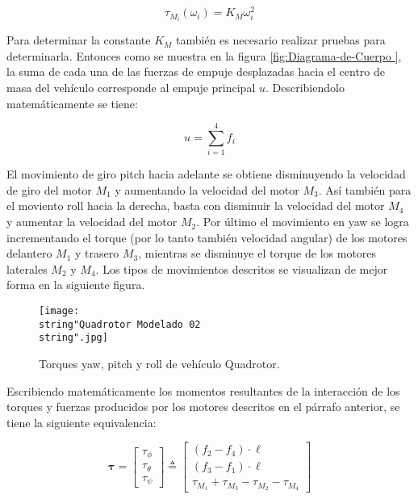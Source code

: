 \documentclass[../main.tex]{subfiles}
\begin{document}
\begin{equation}
\tau_{M_{i}}(\omega_{i})=K_{M}\omega_{i}^{2}
\end{equation}

Para determinar la constante $K_{M}$ también es necesario realizar
pruebas para determinarla.
Entonces como se muestra en la figura \ref{fig:Diagrama-de-Cuerpo },
la suma de cada una de las fuerzas de empuje desplazadas hacia el
centro de masa del vehículo corresponde al empuje principal $u.$
Describiendolo matemáticamente se tiene:

\begin{equation}
u=\sum_{i=1}^{4}f_{i}\label{eq:Empuje Total}
\end{equation}

El movimiento de giro pitch hacia adelante se obtiene disminuyendo
la velocidad de giro del motor $M_{1}$ y aumentando la velocidad
del motor $M_{3}$. Así también para el moviento roll hacia la derecha,
basta con disminuir la velocidad del motor $M_{4}$ y aumentar la
velocidad del motor $M_{2}$. Por último el movimiento en yaw se logra
incrementando el torque (por lo tanto también velocidad angular) de
los motores delantero $M_{1}$ y trasero $M_{3}$, mientras se disminuye
el torque de los motores laterales $M_{2}$ y $M_{4}$. Los tipos
de movimientos descritos se visualizan de mejor forma en la siguiente
figura.

\begin{figure}[H]
\noindent \begin{centering}
\texttt{[image: \\string"Quadrotor Modelado 02\\string".jpg]}
\par\end{centering}
\caption{Torques yaw, pitch y roll de vehículo Quadrotor.}
\end{figure}

\textcompwordmark{}

Escribiendo matemáticamente los momentos resultantes de la interacción
de los torques y fuerzas producidos por los motores descritos en el
párrafo anterior, se tiene la siguiente equivalencia:

\begin{equation}
\mathbf{\tau}=\left[\begin{array}{c}
\tau_{\phi}\\
\tau_{\theta}\\
\tau_{\psi}
\end{array}\right]\triangleq\begin{bmatrix}(f_{2}-f_{4})\cdot\ell\\
(f_{3}-f_{1})\cdot\ell\\
\tau_{M_{1}}+\tau_{M_{3}}-\tau_{M_{2}}-\tau_{M_{4}}
\end{bmatrix}\label{eq:Momentos Rotacionales}
\end{equation}
\end{document}

